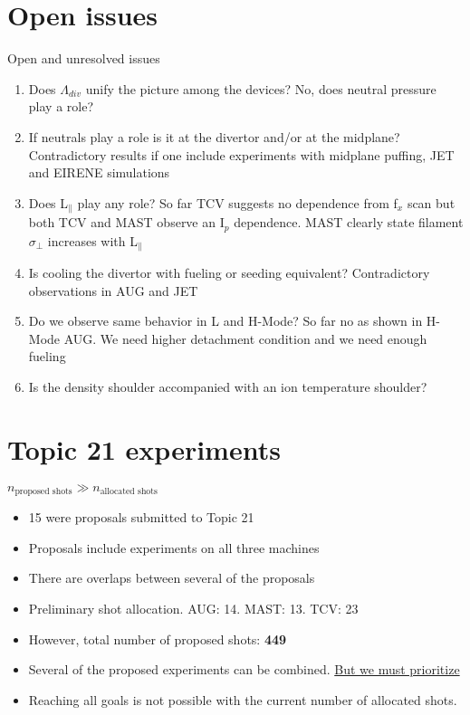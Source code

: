 \documentclass[10pt, compress]{beamer}
\begin{document}
  \section{Open issues}
  \begin{frame}{Open and unresolved issues}
  \begin{enumerate}[<+(1) | invisible@-+>]
    \item Does $\Lambda_{div}$ unify the picture among the devices?
      \alert{No, does neutral pressure play a role?}
    \item If neutrals play a role is it at the divertor and/or at the midplane?
      \alert{Contradictory results if one include experiments with
        midplane puffing, JET and EIRENE simulations}
    \item Does L$_\parallel$ play any role? \alert{So far TCV suggests no
      dependence from f$_x$ scan but both TCV and MAST observe an
      I$_p$ dependence. MAST clearly state filament $\sigma_{\perp}$
      increases with L$_{\parallel}$ }
    \item Is cooling the divertor with fueling or seeding equivalent? \alert{Contradictory observations in AUG and JET}
    \item Do we observe same behavior in L and H-Mode? \alert{So
      far no as shown in H-Mode AUG. We need higher detachment
      condition and we need enough fueling}
      \item Is the density shoulder accompanied with an ion temperature shoulder?
    \end{enumerate}
  \end{frame}
  
\section{Topic 21 experiments }
\begin{frame}{$n_{\text{proposed shots}} \gg n_{\text{allocated shots}}$}
	\begin{itemize}
		\item 15 were proposals submitted to Topic 21
		\item Proposals include experiments on all three machines 
		\item There are overlaps between several of the proposals 
		\item Preliminary shot allocation. AUG: 14. MAST: 13. TCV: 23 
		\item However, total number of proposed shots:  \textbf{449}
		\item Several of the proposed experiments can be combined. \underline{But we must prioritize}
		\item Reaching all goals is not possible with the current number of allocated shots.
	\end{itemize}
\end{frame}
\end{document}
